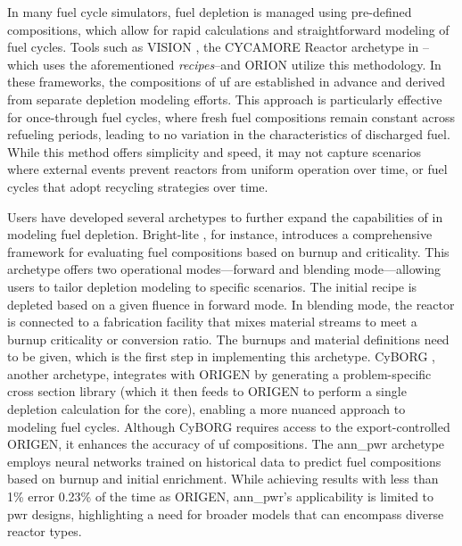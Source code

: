 In many fuel cycle simulators, fuel depletion is managed using pre-defined
compositions, which allow for rapid calculations and straightforward modeling
of fuel cycles. Tools such as VISION \cite{yacout_visionverifiable_2006}, the
CYCAMORE Reactor archetype in \cyclus--which uses the aforementioned
\textit{recipes}--and ORION utilize this methodology. In these frameworks, the
compositions of \gls{uf} are established in advance and derived from
separate depletion modeling efforts. This approach is particularly effective
for once-through fuel cycles, where fresh fuel compositions remain constant
across refueling periods, leading to no variation in the characteristics
of discharged fuel. While this method offers simplicity and speed, it may not
capture scenarios where external events prevent reactors from uniform operation over time, or fuel cycles that adopt recycling strategies over time.

Users have developed several archetypes to further expand the capabilities of \cyclus in modeling fuel depletion. Bright-lite \cite{schneider_integrated_2016}, for instance, introduces a comprehensive
framework for evaluating fuel compositions based on burnup and criticality.
This archetype offers two operational modes—forward and blending mode—allowing
users to tailor depletion modeling to specific scenarios. The initial recipe is depleted based on a given fluence in forward mode. In blending mode, the
reactor is connected to a fabrication facility that mixes material streams to
meet a burnup criticality or conversion ratio. The burnups and material
definitions need to be given, which is the first step in implementing this
archetype. CyBORG \cite{skutnik_cyborg_2016}, another \cyclus archetype,
integrates \cyclus with ORIGEN by generating a problem-specific cross section
library (which it then feeds to ORIGEN to perform a single depletion
calculation for the core), enabling a more nuanced approach to modeling fuel
cycles. Although CyBORG requires access to the export-controlled ORIGEN, it
enhances the accuracy of \gls{uf} compositions. The ann\_pwr \cite{bae_deep_2020} archetype employs neural networks trained on
historical data to predict fuel compositions based on burnup and initial
enrichment. While achieving results with less than 1\% error 0.23\% of the
time as ORIGEN, ann\_pwr's applicability is limited to \gls{pwr} designs,
highlighting a need for broader models that can encompass diverse
reactor types.

